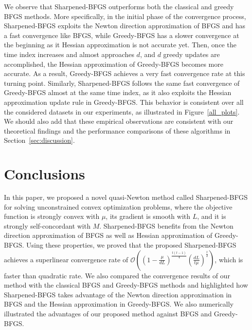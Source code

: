 \documentclass[11pt]{article}
\numberwithin{assumption}{section}
\numberwithin{remark}{section}
\numberwithin{theorem}{section}
\begin{document}
We observe that Sharpened-BFGS outperforms both the classical and greedy 
BFGS methods. More specifically, in the initial phase of the convergence process, Sharpened-BFGS exploits the Newton direction approximation of BFGS and has a fast convergence like BFGS, while Greedy-BFGS has a slower convergence at the beginning as it Hessian approximation is not accurate yet. Then, once the time index increases and almost approaches $d$, and $d$ greedy updates are accomplished, the Hessian approximation of Greedy-BFGS becomes more accurate. As a result, Greedy-BFGS achieves a very fast convergence rate at this turning point. Similarly, Sharpened-BFGS follows the same fast convergence of Greedy-BFGS almost at the same time index, as it also exploits the Hessian approximation update rule in Greedy-BFGS. This behavior is consistent over all the considered datasets in our experiments, as illustrated in Figure~\ref{all_plots}. We should also add that 
these empirical observations are consistent with our theoretical findings and the performance comparisons of these algorithms in Section~\ref{sec:discussion}. 

\vspace{-8mm}

\section{Conclusions}\label{sec:conclusion}

\vspace{-5mm}

In this paper, we proposed a novel quasi-Newton method called Sharpened-BFGS for solving unconstrained convex optimization problems, where the objective function is strongly convex with $\mu$, its gradient is smooth with $L$, and it is strongly self-concordant with $M$. Sharpened-BFGS benefits from the Newton direction approximation of BFGS as well as Hessian approximation of Greedy-BFGS. Using these properties, we proved that the proposed Sharpened-BFGS achieves a superlinear convergence rate of $\mathcal{O}((1 - \frac{\mu}{dL})^{\frac{t(t - 1)}{4}} (\frac{dL}{t\mu})^{\frac{t}{2}})$, which is faster than quadratic rate. We also compared the convergence results of our method with the classical BFGS and Greedy-BFGS methods and highlighted how Sharpened-BFGS takes advantage of the Newton direction approximation in BFGS and the Hessian approximation in Greedy-BFGS. We also numerically illustrated the advantages of our proposed method  against BFGS and Greedy-BFGS.
\end{document}
